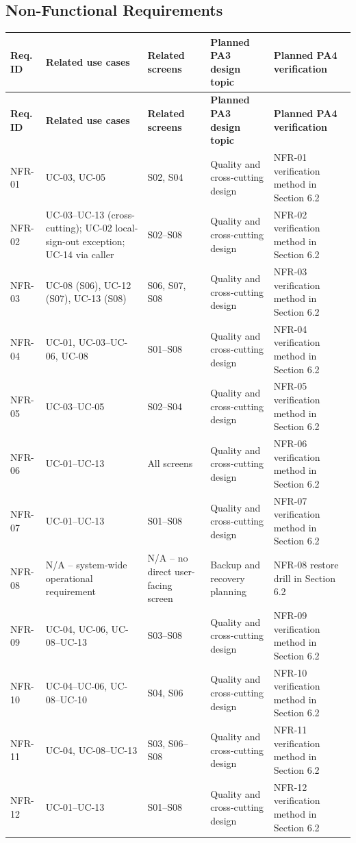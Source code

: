 \subsection{Non-Functional Requirements}
\begingroup
\small
{}
\setlength{\tabcolsep}{3pt}
\renewcommand{\arraystretch}{1.1}
\begin{longtable}{|>{\raggedright\arraybackslash}p{}|>{\raggedright\arraybackslash}p{}|>{\raggedright\arraybackslash}p{}|>{\raggedright\arraybackslash}p{}|>{\raggedright\arraybackslash}p{}|}
\hline
\textbf{Req. ID} & \textbf{Related use cases} & \textbf{Related screens} & \textbf{Planned PA3 design topic} & \textbf{Planned PA4 verification} \\ \hline
\endfirsthead
\hline
\textbf{Req. ID} & \textbf{Related use cases} & \textbf{Related screens} & \textbf{Planned PA3 design topic} & \textbf{Planned PA4 verification} \\ \hline
\endhead
\hline
\endfoot
\hline
\endlastfoot
NFR-01 & UC-03, UC-05 & S02, S04 & Quality and cross-cutting design & NFR-01 verification method in Section 6.2 \\ \hline
NFR-02 & UC-03--UC-13 (cross-cutting); UC-02 local-sign-out exception; UC-14 via caller & S02--S08 & Quality and cross-cutting design & NFR-02 verification method in Section 6.2 \\ \hline
NFR-03 & UC-08 (S06), UC-12 (S07), UC-13 (S08) & S06, S07, S08 & Quality and cross-cutting design & NFR-03 verification method in Section 6.2 \\ \hline
NFR-04 & UC-01, UC-03--UC-06, UC-08 & S01--S08 & Quality and cross-cutting design & NFR-04 verification method in Section 6.2 \\ \hline
NFR-05 & UC-03--UC-05 & S02--S04 & Quality and cross-cutting design & NFR-05 verification method in Section 6.2 \\ \hline
NFR-06 & UC-01--UC-13 & All screens & Quality and cross-cutting design & NFR-06 verification method in Section 6.2 \\ \hline
NFR-07 & UC-01--UC-13 & S01--S08 & Quality and cross-cutting design & NFR-07 verification method in Section 6.2 \\ \hline
NFR-08 & N/A -- system-wide operational requirement & N/A -- no direct user-facing screen & Backup and recovery planning & NFR-08 restore drill in Section 6.2 \\ \hline
NFR-09 & UC-04, UC-06, UC-08--UC-13 & S03--S08 & Quality and cross-cutting design & NFR-09 verification method in Section 6.2 \\ \hline
NFR-10 & UC-04--UC-06, UC-08--UC-10 & S04, S06 & Quality and cross-cutting design & NFR-10 verification method in Section 6.2 \\ \hline
NFR-11 & UC-04, UC-08--UC-13 & S03, S06--S08 & Quality and cross-cutting design & NFR-11 verification method in Section 6.2 \\ \hline
NFR-12 & UC-01--UC-13 & S01--S08 & Quality and cross-cutting design & NFR-12 verification method in Section 6.2 \\ \hline
\end{longtable}
\endgroup

